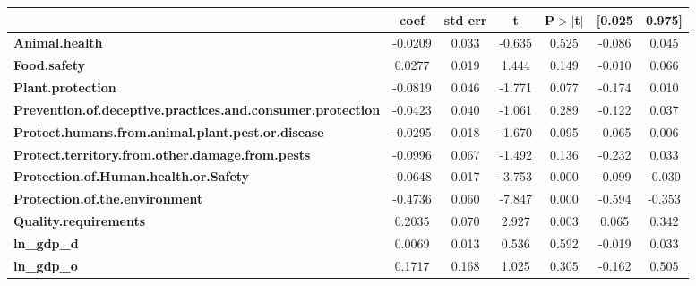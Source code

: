 \begin{center}
\begin{tabular}{lcccccc}
                                                                   & \textbf{coef} & \textbf{std err} & \textbf{t} & \textbf{P$> |$t$|$} & \textbf{[0.025} & \textbf{0.975]}  \\
\midrule
\textbf{Animal.health}                                             &      -0.0209  &        0.033     &    -0.635  &         0.525        &       -0.086    &        0.045     \\
\textbf{Food.safety}                                               &       0.0277  &        0.019     &     1.444  &         0.149        &       -0.010    &        0.066     \\
\textbf{Plant.protection}                                          &      -0.0819  &        0.046     &    -1.771  &         0.077        &       -0.174    &        0.010     \\
\textbf{Prevention.of.deceptive.practices.and.consumer.protection} &      -0.0423  &        0.040     &    -1.061  &         0.289        &       -0.122    &        0.037     \\
\textbf{Protect.humans.from.animal.plant.pest.or.disease}          &      -0.0295  &        0.018     &    -1.670  &         0.095        &       -0.065    &        0.006     \\
\textbf{Protect.territory.from.other.damage.from.pests}            &      -0.0996  &        0.067     &    -1.492  &         0.136        &       -0.232    &        0.033     \\
\textbf{Protection.of.Human.health.or.Safety}                      &      -0.0648  &        0.017     &    -3.753  &         0.000        &       -0.099    &       -0.030     \\
\textbf{Protection.of.the.environment}                             &      -0.4736  &        0.060     &    -7.847  &         0.000        &       -0.594    &       -0.353     \\
\textbf{Quality.requirements}                                      &       0.2035  &        0.070     &     2.927  &         0.003        &        0.065    &        0.342     \\
\textbf{ln\_gdp\_d}                                                &       0.0069  &        0.013     &     0.536  &         0.592        &       -0.019    &        0.033     \\
\textbf{ln\_gdp\_o}                                                &       0.1717  &        0.168     &     1.025  &         0.305        &       -0.162    &        0.505     \\

\end{tabular}
\end{center}
